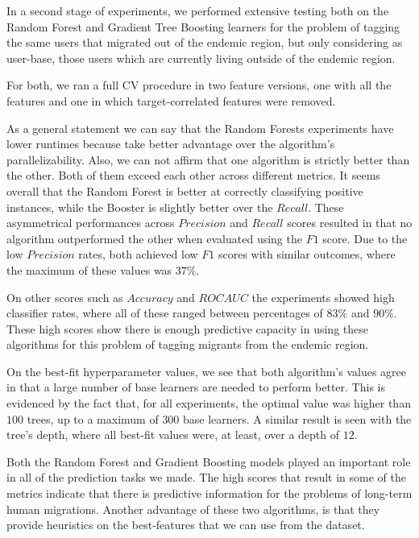 
In a second stage of experiments, we performed extensive testing both on the Random Forest and Gradient Tree Boosting learners for the problem of tagging the same users that migrated out of the endemic region, but only considering as user-base, those users which are currently living outside of the endemic region.

For both, we ran a full CV procedure in two feature versions, one with all the features and one in which target-correlated features were removed.

As a general statement we can say that the Random Forests experiments have lower runtimes because take better advantage over the algorithm's parallelizability.
Also, we can not affirm that one algorithm is strictly better than the other.
Both of them exceed each other across different metrics.
It seems overall that the Random Forest is better at correctly classifying positive instances, while the Booster is slightly better over the $Recall$.
These asymmetrical performances across $Precision$ and $Recall$ scores resulted in that no algorithm outperformed the other when evaluated using the $F1$ score.
Due to the low $Precision$ rates, both achieved low $F1$ scores with similar outcomes, where the maximum of these values was $37\%$.

On other scores such as $Accuracy$ and $ROC AUC$ the experiments showed high classifier rates, where all of these ranged between percentages of $83\%$ and $90\%$.
These high scores show there is enough predictive capacity in using these algorithms for this problem of tagging migrants from the endemic region.

On the best-fit hyperparameter values, we see that both algorithm's values agree in that a large number of base learners are needed to perform better.
This is evidenced by the fact that, for all experiments, the optimal value was higher than $100$ trees, up to a maximum of $300$ base learners.
A similar result is seen with the tree's depth, where all best-fit values were, at least, over a depth of $12$.



Both the Random Forest and Gradient Boosting models played an important role in all of the prediction tasks we made.
The high scores that result in some of the metrics indicate that there is predictive information for the problems of long-term human migrations.
Another advantage of these two algorithms, is that they provide heuristics on the best-features that we can use from the dataset.

